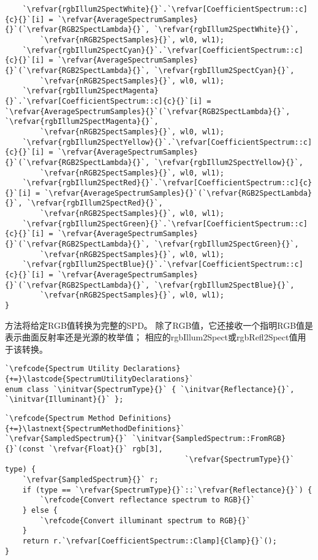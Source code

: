 \begin{lstlisting}
    `\refvar{rgbIllum2SpectWhite}{}`.`\refvar[CoefficientSpectrum::c]{c}{}`[i] = `\refvar{AverageSpectrumSamples}{}`(`\refvar{RGB2SpectLambda}{}`, `\refvar{rgbIllum2SpectWhite}{}`, 
        `\refvar{nRGB2SpectSamples}{}`, wl0, wl1);
    `\refvar{rgbIllum2SpectCyan}{}`.`\refvar[CoefficientSpectrum::c]{c}{}`[i] = `\refvar{AverageSpectrumSamples}{}`(`\refvar{RGB2SpectLambda}{}`, `\refvar{rgbIllum2SpectCyan}{}`, 
        `\refvar{nRGB2SpectSamples}{}`, wl0, wl1);
    `\refvar{rgbIllum2SpectMagenta}{}`.`\refvar[CoefficientSpectrum::c]{c}{}`[i] = `\refvar{AverageSpectrumSamples}{}`(`\refvar{RGB2SpectLambda}{}`, `\refvar{rgbIllum2SpectMagenta}{}`, 
        `\refvar{nRGB2SpectSamples}{}`, wl0, wl1);
    `\refvar{rgbIllum2SpectYellow}{}`.`\refvar[CoefficientSpectrum::c]{c}{}`[i] = `\refvar{AverageSpectrumSamples}{}`(`\refvar{RGB2SpectLambda}{}`, `\refvar{rgbIllum2SpectYellow}{}`, 
        `\refvar{nRGB2SpectSamples}{}`, wl0, wl1);
    `\refvar{rgbIllum2SpectRed}{}`.`\refvar[CoefficientSpectrum::c]{c}{}`[i] = `\refvar{AverageSpectrumSamples}{}`(`\refvar{RGB2SpectLambda}{}`, `\refvar{rgbIllum2SpectRed}{}`, 
        `\refvar{nRGB2SpectSamples}{}`, wl0, wl1);
    `\refvar{rgbIllum2SpectGreen}{}`.`\refvar[CoefficientSpectrum::c]{c}{}`[i] = `\refvar{AverageSpectrumSamples}{}`(`\refvar{RGB2SpectLambda}{}`, `\refvar{rgbIllum2SpectGreen}{}`, 
        `\refvar{nRGB2SpectSamples}{}`, wl0, wl1);
    `\refvar{rgbIllum2SpectBlue}{}`.`\refvar[CoefficientSpectrum::c]{c}{}`[i] = `\refvar{AverageSpectrumSamples}{}`(`\refvar{RGB2SpectLambda}{}`, `\refvar{rgbIllum2SpectBlue}{}`, 
        `\refvar{nRGB2SpectSamples}{}`, wl0, wl1);
}
\end{lstlisting}

方法将给定RGB值转换为完整的SPD。
除了RGB值，它还接收一个指明RGB值是表示曲面反射率还是光源的枚举值；
相应的{\ttfamily rgbIllum2Spect}或{\ttfamily rgbRefl2Spect}值用于该转换。
\begin{lstlisting}
`\refcode{Spectrum Utility Declarations}{+=}\lastcode{SpectrumUtilityDeclarations}`
enum class `\initvar{SpectrumType}{}` { `\initvar{Reflectance}{}`, `\initvar{Illuminant}{}` };
\end{lstlisting}
\begin{lstlisting}
`\refcode{Spectrum Method Definitions}{+=}\lastnext{SpectrumMethodDefinitions}`
`\refvar{SampledSpectrum}{}` `\initvar{SampledSpectrum::FromRGB}{}`(const `\refvar{Float}{}` rgb[3],
                                         `\refvar{SpectrumType}{}` type) {
    `\refvar{SampledSpectrum}{}` r;
    if (type == `\refvar{SpectrumType}{}`::`\refvar{Reflectance}{}`) {
        `\refcode{Convert reflectance spectrum to RGB}{}`
    } else {
        `\refcode{Convert illuminant spectrum to RGB}{}`
    }
    return r.`\refvar[CoefficientSpectrum::Clamp]{Clamp}{}`();
}
\end{lstlisting}

